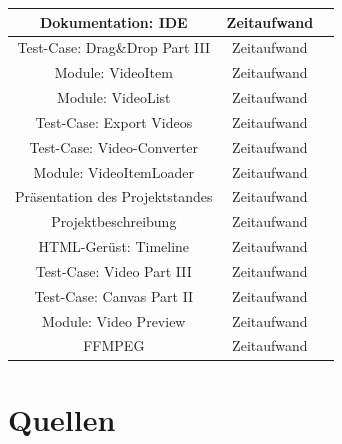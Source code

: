 \documentclass[a4paper,10pt]{scrartcl}
\begin{document}
\begin{tabular}{|c|c|c|}
	Dokumentation: IDE & Zeitaufwand \\ \hline
	
	Test-Case: Drag\&Drop Part III & Zeitaufwand \\ \hline
	
	Module: VideoItem & Zeitaufwand \\ \hline
	
	Module: VideoList & Zeitaufwand \\ \hline
	
	Test-Case: Export Videos & Zeitaufwand \\ \hline
	
	Test-Case: Video-Converter & Zeitaufwand \\ \hline
	
	Module: VideoItemLoader & Zeitaufwand \\ \hline
	
	Präsentation des Projektstandes & Zeitaufwand \\ \hline
	
	Projektbeschreibung & Zeitaufwand \\ \hline
	
	HTML-Gerüst: Timeline & Zeitaufwand \\ \hline
	
	Test-Case: Video Part III & Zeitaufwand \\ \hline
	
	Test-Case: Canvas Part II & Zeitaufwand \\ \hline
	
	Module: Video Preview & Zeitaufwand \\ \hline
	
	FFMPEG & Zeitaufwand \\ \hline
 \end{tabular}
\newpage
\section{Quellen}
\end{document}
